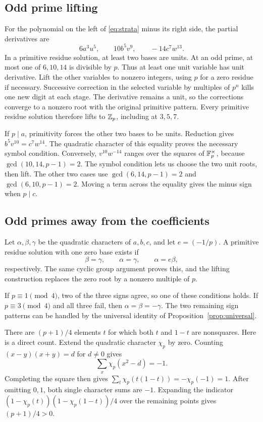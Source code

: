 \subsection{Odd prime lifting}
For the polynomial on the left of \eqref{eq:strata} minus its right side, the partial derivatives are
\[
6a^3u^5,\qquad10b^5v^9,\qquad-14c^7w^{13}.
\]
In a primitive residue solution, at least two bases are units. At an odd prime, at most one of $6,10,14$ is divisible by $p$. Thus at least one unit variable has unit derivative. Lift the other variables to nonzero integers, using $p$ for a zero residue if necessary. Successive correction in the selected variable by multiples of $p^n$ kills one new digit at each stage. The derivative remains a unit, so the corrections converge to a nonzero root with the original primitive pattern. Every primitive residue solution therefore lifts to $\mathbb Z_p$, including at $3,5,7$.

If $p\mid a$, primitivity forces the other two bases to be units. Reduction gives $b^5v^{10}=c^7w^{14}$. The quadratic character of this equality proves the necessary symbol condition. Conversely, $v^{10}w^{-14}$ ranges over the squares of $\mathbb F_p^\times$, because $\gcd(10,14,p-1)=2$. The symbol condition lets us choose the two unit roots, then lift. The other two cases use $\gcd(6,14,p-1)=2$ and $\gcd(6,10,p-1)=2$. Moving a term across the equality gives the minus sign when $p\mid c$.

\subsection{Odd primes away from the coefficients}
Let $\alpha,\beta,\gamma$ be the quadratic characters of $a,b,c$, and let $e=(-1/p)$. A primitive residue solution with one zero base exists if
\[
\beta=\gamma,\qquad\alpha=\gamma,\qquad\alpha=e\beta,
\]
respectively. The same cyclic group argument proves this, and the lifting construction replaces the zero root by a nonzero multiple of $p$.

If $p\equiv1\pmod4$, two of the three signs agree, so one of these conditions holds. If $p\equiv3\pmod4$ and all three fail, then $\alpha=\beta=-\gamma$. The two remaining sign patterns can be handled by the universal identity of Proposition~\ref{prop:universal}.

There are $(p+1)/4$ elements $t$ for which both $t$ and $1-t$ are nonsquares. Here is a direct count. Extend the quadratic character $\chi_p$ by zero. Counting $(x-y)(x+y)=d$ for $d\ne0$ gives
\[
\sum_x\chi_p(x^2-d)=-1.
\]
Completing the square then gives $\sum_t\chi_p(t(1-t))=-\chi_p(-1)=1$. After omitting $0,1$, both single character sums are $-1$. Expanding the indicator $(1-\chi_p(t))(1-\chi_p(1-t))/4$ over the remaining points gives $(p+1)/4>0$.

